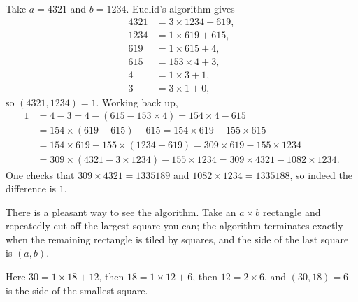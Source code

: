 \documentclass[a4paper]{scrartcl}
\begin{document}
\begin{example}
	Take $a = 4321$ and $b = 1234$. Euclid's algorithm gives
	\begin{align*}
		4321 &= 3 \times 1234 + 619, \\
		1234 &= 1 \times 619 + 615, \\
		619 &= 1 \times 615 + 4, \\
		615 &= 153 \times 4 + 3, \\
		4 &= 1 \times 3 + 1, \\
		3 &= 3 \times 1 + 0,
	\end{align*}
	so $(4321, 1234) = 1$. Working back up,
	\begin{align*}
		1 &= 4 - 3 = 4 - (615 - 153 \times 4) = 154 \times 4 - 615 \\
		&= 154 \times (619 - 615) - 615 = 154 \times 619 - 155 \times 615 \\
		&= 154 \times 619 - 155 \times (1234 - 619) = 309 \times 619 - 155 \times 1234 \\
		&= 309 \times (4321 - 3 \times 1234) - 155 \times 1234 = 309 \times 4321 - 1082 \times 1234.
	\end{align*}
	One checks that $309 \times 4321 = 1335189$ and $1082 \times 1234 = 1335188$, so indeed the difference is $1$.
\end{example}

There is a pleasant way to see the algorithm. Take an $a \times b$ rectangle and repeatedly cut off the largest square you can; the algorithm terminates exactly when the remaining rectangle is tiled by squares, and the side of the last square is $(a, b)$.

\begin{center}
\end{center}

Here $30 = 1 \times 18 + 12$, then $18 = 1 \times 12 + 6$, then $12 = 2 \times 6$, and $(30, 18) = 6$ is the side of the smallest square.
\end{document}
